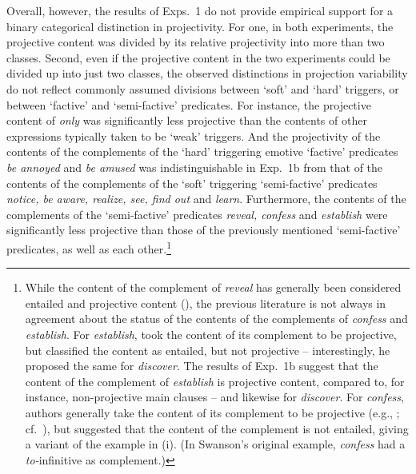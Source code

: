 \documentclass[11pt,fleqn]{article}
\newcommand{\6}{\mbox{$[\hspace*{-.6mm}[$}}
\newcommand{\9}{\mbox{$]\hspace*{-.6mm}]$}}
\begin{document}
Overall, however, the results of Exps.~1 do not provide empirical support for a binary categorical distinction in projectivity. For one, in both experiments, the projective content was divided by its relative projectivity into more than two classes. Second, even if the projective content in the two experiments could be divided up into just two classes, the observed distinctions in projection variability do not reflect commonly assumed divisions between `soft' and `hard' triggers, or between `factive' and `semi-factive' predicates. For instance, the projective content of {\em only} was significantly less projective than the contents of other expressions typically taken to be `weak' triggers. And the projectivity of the contents of the complements of the `hard' triggering emotive `factive' predicates {\em be annoyed} and {\em be amused} was indistinguishable in Exp.~1b from that of the contents of the complements of the `soft' triggering `semi-factive' predicates {\em notice, be aware, realize, see, find out} and {\em learn}. Furthermore, the contents of the complements of the `semi-factive' predicates {\em reveal, confess} and {\em establish} were significantly less projective than those of the previously mentioned `semi-factive' predicates, as well as each other.\footnote{While the content of the complement of {\em reveal} has generally been considered entailed and projective content (\citealt{hooper1974,melvold1991}), the previous literature is not always in agreement about the status of the contents of the complements of {\em confess} and {\em establish}. For {\em establish}, \citet{wyse} took the content of its complement to be projective, but \citet{swanson2012} classified the content as entailed, but not projective -- interestingly, he proposed the same for {\em discover}. The results of Exp.~1b suggest that the content of the complement of {\em establish} is projective content, compared to, for instance, non-projective main clauses -- and likewise for {\em discover}. For {\em confess}, authors generally take the content of its complement to be projective (e.g., \citealt{reis1973,melvold1991,schultz2003,swanson2012,karttunen2016}; cf.\ \citealt{wyse}), but \citet{swanson2012} suggested that the content of the complement is not entailed, giving a variant of the example in (i). (In Swanson's original example, {\em confess} had a {\em to-}infinitive as complement.)

}
\end{document}
